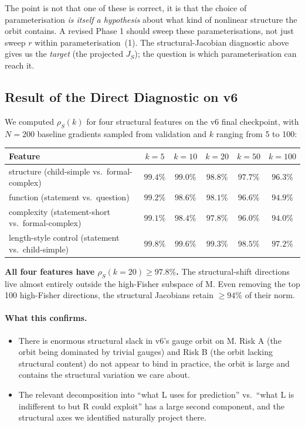 \documentclass[11pt, a4paper]{article}
\theoremstyle{plain}
\theoremstyle{definition}
\theoremstyle{remark}
\begin{document}
The point is not that one of these is correct, it is that the choice of parameterisation \emph{is itself a hypothesis} about what kind of nonlinear structure the orbit contains.
A revised Phase 1 should sweep these parameterisations, not just sweep $r$ within parameterisation~(1).
The structural-Jacobian diagnostic above gives us the \emph{target} (the projected $J_S$); the question is which parameterisation can reach it.

\subsection{Result of the Direct Diagnostic on v6}

We computed $\rho_S(k)$ for four structural features on the v6 final checkpoint, with $N = 200$ baseline gradients sampled from validation and $k$ ranging from 5 to 100:

\begin{center}
\begin{tabular}{l c c c c c}
\toprule
Feature & $k=5$ & $k=10$ & $k=20$ & $k=50$ & $k=100$ \\
\midrule
structure (child-simple vs.\ formal-complex) & $99.4\%$ & $99.0\%$ & $98.8\%$ & $97.7\%$ & $96.3\%$ \\
function (statement vs.\ question) & $99.2\%$ & $98.6\%$ & $98.1\%$ & $96.6\%$ & $94.9\%$ \\
complexity (statement-short vs.\ formal-complex) & $99.1\%$ & $98.4\%$ & $97.8\%$ & $96.0\%$ & $94.0\%$ \\
length-style control (statement vs.\ child-simple) & $99.8\%$ & $99.6\%$ & $99.3\%$ & $98.5\%$ & $97.2\%$ \\
\bottomrule
\end{tabular}
\end{center}

\textbf{All four features have $\rho_S(k=20) \geq 97.8\%$.}
The structural-shift directions live almost entirely outside the high-Fisher subspace of M.
Even removing the top 100 high-Fisher directions, the structural Jacobians retain $\geq 94\%$ of their norm.

\paragraph{What this confirms.}
\begin{itemize}[nosep]
\item There is enormous structural slack in v6's gauge orbit on M. Risk A (the orbit being dominated by trivial gauges) and Risk B (the orbit lacking structural content) do not appear to bind in practice, the orbit is large and contains the structural variation we care about.
\item The relevant decomposition into ``what L uses for prediction'' vs.\ ``what L is indifferent to but R could exploit'' has a large second component, and the structural axes we identified naturally project there.
\end{itemize}
\end{document}
